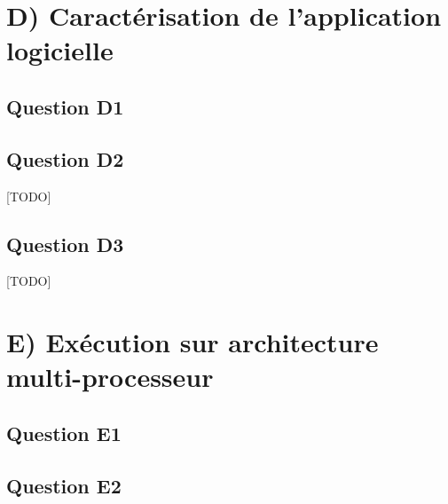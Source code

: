 \documentclass[10pt]{article}
\begin{document}
\newpage

\section{D) Caractérisation de l'application logicielle}
\subsection{Question D1}


\subsection{Question D2}
[TODO]

\subsection{Question D3}
[TODO]

\section{E) Exécution sur architecture multi-processeur}
\subsection{Question E1}


\subsection{Question E2}

\end{document}
